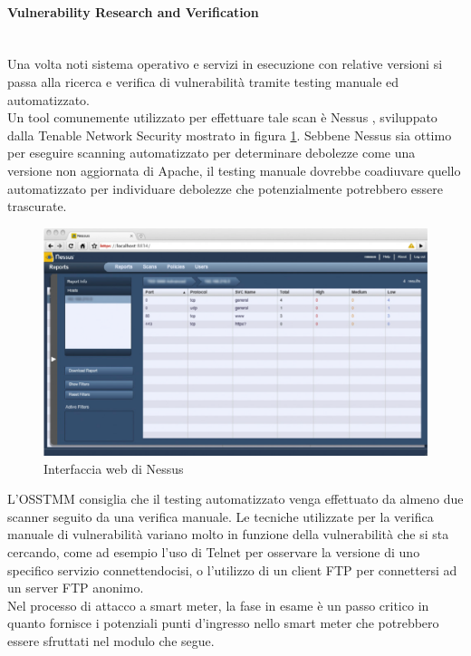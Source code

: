 \paragraph{Vulnerability Research and Verification}\mbox{}\\
Una volta noti sistema operativo e servizi in esecuzione con relative versioni si passa alla ricerca  e verifica di vulnerabilità tramite testing manuale ed automatizzato.\\
Un tool comunemente utilizzato per effettuare tale scan è Nessus \cite{nessus}, sviluppato dalla Tenable Network Security mostrato in figura \ref{nessus_img}. Sebbene Nessus sia ottimo per eseguire scanning automatizzato per determinare debolezze come una versione non aggiornata di Apache, il testing manuale dovrebbe coadiuvare quello automatizzato per individuare debolezze che potenzialmente potrebbero essere trascurate.\\
\begin{figure}[hbtp]
	\centering
	\includegraphics[scale=.3]{imgs/attack/nessus.png}
	\caption{Interfaccia web di Nessus}
	\label{nessus_img}
\end{figure}
L'OSSTMM consiglia che il testing automatizzato venga effettuato da almeno due scanner seguito da una verifica manuale. Le tecniche utilizzate per la verifica manuale di vulnerabilità variano molto in funzione della vulnerabilità che si sta cercando, come ad esempio l'uso di Telnet per osservare la versione di uno specifico servizio connettendocisi, o l'utilizzo di un client FTP per connettersi ad un server FTP anonimo.\\
Nel processo di attacco a smart meter, la fase in esame è un passo critico in quanto fornisce i potenziali punti d'ingresso nello smart meter che potrebbero essere sfruttati nel modulo che segue.

